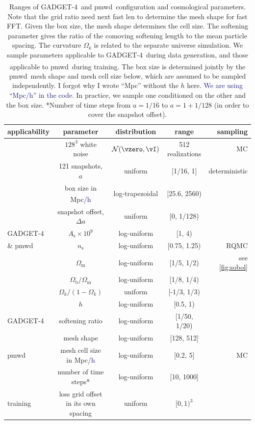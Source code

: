 \documentclass[modern, trackchanges, dvipsnames]{aastex631}
\newcommand{\pmwd}{{\usefont{T1}{nova}{m}{sl}pmwd}}
\newcommand{\GADGET}{{{\fontsize{10pt}{12pt}\selectfont GADGET}-4}}
\newcommand{\As}{A_\mathrm{s}}
\newcommand{\ns}{n_\mathrm{s}}
\newcommand{\Omegam}{\Omega_\mathrm{m}}
\newcommand{\Omegab}{\Omega_\mathrm{b}}
\newcommand{\YL}[1]{\textcolor{Bittersweet}{#1}}
\newcommand{\YZ}[1]{\textcolor{MidnightBlue}{#1}}
\begin{document}
\begin{table}
  \centering
  \caption{Ranges of \GADGET\ and \pmwd\ configuration and cosmological
  parameters.
  Note that the grid ratio need next fast len to determine the mesh shape
  for fast FFT.
  Given the box size, the mesh shape determines the cell size.
  The softening parameter gives the ratio of the comoving softening length
  to the mean particle spacing.
  The curvature $\Omega_k$ is related to the separate universe simulation.
  We sample parameters applicable to \GADGET\ during data generation, and
  those applicable to \pmwd\ during training.
  \textsuperscript\dag{}The box size is determined jointly by the \pmwd\
  mesh shape and mesh cell size below, which are assumed to be sampled
  independently.
  \YL{I forgot why I wrote ``Mpc'' without the $h$ here.}
  \YZ{We are using ``Mpc/h'' in the code.}
  In practice, we sample one conditioned on the other and the box size.
  *Number of time steps from $a=1/16$ to $a=1+1/128$ (in order to cover the
  snapshot offset).
  }
  \label{tab:param}
  \begin{tabular}{lcccr}
  \toprule
  applicability & parameter & distribution & range & sampling \\
  \midrule
  & $128^3$ white noise & $\mathcal{N}(\vzero, \vI)$ & 512 realizations & MC \\
  \cmidrule(lr){2-5}
  & 121 snapshots, $a$ & uniform & [1/16, 1] & deterministic \\
  \cmidrule(lr){2-5}
  & box size in Mpc\YZ{/h}\textsuperscript\dag & log-trapezoidal & [25.6, 2560) \\
  \cmidrule(lr){2-4}
  & snapshot offset, $\Delta\!a$ & uniform & [0, 1/128) \\
  \cmidrule(lr){2-4}
  \GADGET\ & $\As \times 10^9$ & log-uniform & [1, 4) \\
  \cmidrule(lr){2-4}
  \& \pmwd\ & $\ns$ & log-uniform & [0.75, 1.25) & RQMC \\
  \cmidrule(lr){2-4}
  & $\Omegam$ & log-uniform & [1/5, 1/2) & see \autoref{fig:sobol} \\
  \cmidrule(lr){2-4}
  & $\Omegab / \Omegam$ & log-uniform & [1/8, 1/4) \\
  \cmidrule(lr){2-4}
  & $\Omega_k / (1 - \Omega_k)$ & uniform & [-1/3, 1/3) \\
  \cmidrule(lr){2-4}
  & $h$ & log-uniform & [0.5, 1) \\
  \cmidrule(lr){1-4}
  \GADGET\ & softening ratio & log-uniform & [1/50, 1/20) \\
  \cmidrule(lr){1-5}
  & mesh shape & log-uniform & [128, 512] \\
  \cmidrule(lr){2-4}
  \pmwd\ & mesh cell size in Mpc\YZ{/h} & log-uniform & [0.2, 5] & MC \\
  \cmidrule(lr){2-4}
  & number of time steps* & log-uniform & [10, 1000] \\
  \cmidrule(lr){1-4}
  training & loss grid offset in its own spacing & uniform & $[0, 1)^3$ \\
  \bottomrule
  \end{tabular}
  \end{table}
\end{document}
